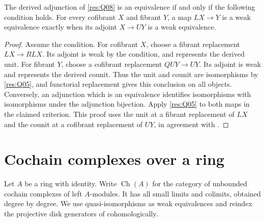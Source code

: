 \begin{theorem}\label{res:Q09}
The derived adjunction of \ref{res:Q08} is an equivalence
if and only if the following condition holds. For every
cofibrant \(X\) and fibrant \(Y\), a map \(LX\to Y\) is
a weak equivalence exactly when its adjoint \(X\to UY\)
is a weak equivalence.
\end{theorem}
\begin{proof}
Assume the condition. For cofibrant \(X\), choose a
fibrant replacement \(LX\to R LX\). Its adjoint is
weak by the condition, and represents the derived unit.
For fibrant \(Y\), choose a cofibrant replacement
\(Q UY\to UY\). Its adjoint is weak and represents
the derived counit. Thus the unit and counit are
isomorphisms by \ref{res:Q05}, and functorial
replacement gives this conclusion on all objects.
Conversely, an adjunction which is an equivalence
identifies isomorphisms with isomorphisms under the
adjunction bijection. Apply \ref{res:Q05} to both
maps in the claimed criterion. This proof uses the
unit at a fibrant replacement of \(LX\) and the
counit at a cofibrant replacement of \(UY\), in agreement
with \cite[correction to Corollary 1.3.16]{hovey-errata}.
\end{proof}


\section{Cochain complexes over a ring}

Let \(A\) be a ring with identity. Write \(\operatorname{Ch}(A)\)
for the category of unbounded cochain complexes of left \(A\)-modules.
It has all small limits and colimits, obtained degree by degree.
We use quasi-isomorphisms as weak equivalences and reindex the
projective disk generators of \cite[Section 2.3]{hovey} cohomologically.

